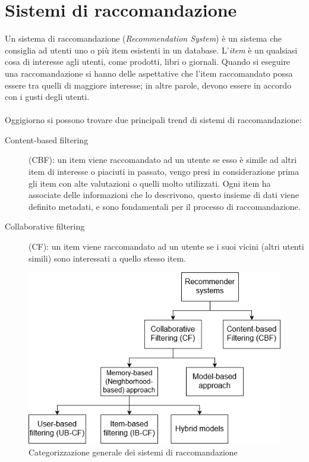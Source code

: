 \newpage

\section{Sistemi di raccomandazione}
Un sistema di raccomandazione (\textit{Recommendation System}) è un sistema che consiglia ad utenti uno o più item esistenti 
in un database. L'\textit{item} è un qualsiasi cosa di interesse agli utenti, come prodotti, libri o giornali. Quando si eseguire
una raccomandazione si hanno delle aspettative che l'item raccomandato possa essere tra quelli di maggiore interesse; in altre parole, 
devono essere in accordo con i gusti degli utenti. 
\\
\\
Oggigiorno si possono trovare due principali trend di sistemi di raccomandazione: 
\begin{description}
	\item[Content-based filtering](CBF): un item viene raccomandato ad un utente se esso è simile ad altri item di interesse o piaciuti
	in passato, vengo presi in considerazione prima gli item con alte valutazioni o quelli molto utilizzati. Ogni item ha associate
	delle informazioni che lo descrivono, questo insieme di dati viene definito metadati, e sono fondamentali per il processo di 
	raccomandazione. 
	\item[Collaborative filtering](CF): un item viene raccomandato ad un utente se i suoi vicini (altri utenti simili) sono 
	interessati a quello stesso item.   
\end{description}

\begin{figure}[ht!]
	\centering
	\includegraphics[scale=0.5]{images/recommender_systems.png}
	\caption{Categorizzazione generale dei sistemi di raccomandazione}
	\label{fig:recommender_systems}
\end{figure}

